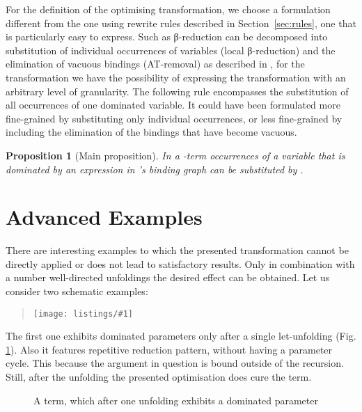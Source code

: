 \documentclass[submission,copyright,creativecommons]{eptcs}
\newtheorem{proposition}[theorem]{Proposition}
\newcommand\listing[1]{\begin{quotation}\noindent\texttt{[image: listings/\#1]}\end{quotation}}
\renewcommand\;{\,}
\begin{document}
\vspace{1ex}
For the definition of the optimising transformation, 
we choose a formulation different from the one using rewrite rules described in Section~\ref{sec:rules},
one that is particularly easy to express.
Such as β-reduction can be decomposed into substitution of individual
occurrences of variables (local β-reduction) and the elimination of vacuous
bindings (AT-removal) as described in \cite{brui:1987}, for the transformation
we have the possibility of expressing the transformation with an arbitrary
level of granularity. The following rule encompasses the substitution of all
occurrences of one dominated variable. It could have been formulated more
fine-grained by substituting only individual occurrences, or less fine-grained
by including the elimination of the bindings that have become vacuous.


\begin{proposition}[Main proposition]
In a -term  occurrences of a variable that is dominated by an
expression  in 's binding graph can be substituted by .

\end{proposition}



\section{Advanced Examples}

There are interesting examples to which the presented transformation cannot be
directly applied or does not lead to satisfactory results. Only in combination
with a number well-directed unfoldings the desired effect can be obtained. Let
us consider two schematic examples: \listing{intricate} The first one exhibits
dominated parameters only after a single let-unfolding (Fig. \ref{fx-fy}). Also
it features repetitive reduction pattern, without having a parameter cycle.
This because the argument in question is bound outside of the recursion. Still,
after the unfolding the presented optimisation does cure the term.

\begin{figure}[ht]
\begin{center}
\hspace{1cm}
\hspace{5mm}\hspace{5mm}
\hspace{1cm}
\caption{\label{fx-fy}A term, which after one unfolding exhibits a dominated parameter}
\end{center}
\end{figure}
\end{document}
